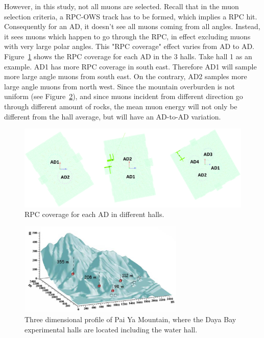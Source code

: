 However, in this study, not all muons are selected. Recall that in the muon selection criteria, a RPC-OWS track has to be formed, which implies a RPC hit. Consequently for an AD, it doesn't see all muons coming from all angles. Instead, it sees muons which happen to go through the RPC, in effect excluding muons with very large polar angles. This "RPC coverage" effect varies from AD to AD. Figure~\ref{fig:rpc_coverage} shows the RPC coverage for each AD in the 3 halls. Take hall 1 as an example. AD1 has more RPC coverage in south east. Therefore AD1 will sample more large angle muons from south east. On the contrary, AD2 samples more large angle muons from north west. Since the mountain overburden is not uniform (see Figure~\ref{fig:muontain_profile}), and since muons incident from different direction go through different amount of rocks, the mean muon energy will not only be different from the hall average, but will have an AD-to-AD variation.
\begin{figure}
	\centering
	\includegraphics[width=\textwidth]{figures/chap7/RPC_coverage.eps}
	\caption{RPC coverage for each AD in different halls.}
	\label{fig:rpc_coverage}
\end{figure}
\begin{figure}
	\centering
	\includegraphics[width=0.7\textwidth]{figures/chap7/mountain_profile.eps}
	\caption[Three dimensional profile of Pai Ya Mountain, where the Daya Bay experimental halls are located including the water hall.]{Three dimensional profile of Pai Ya Mountain, where the Daya Bay experimental halls are located including the water hall.~\cite{dayabay_proposal}}
	\label{fig:muontain_profile}
\end{figure}


